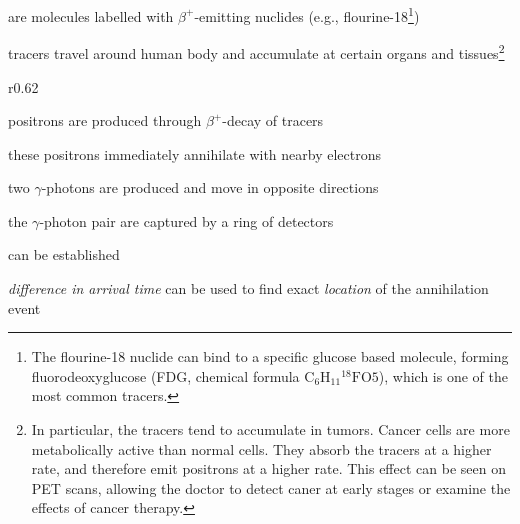  are molecules labelled with $\beta^+$-emitting nuclides (e.g., flourine-18\footnote{The flourine-18 nuclide can bind to a specific glucose based molecule, forming fluorodeoxyglucose (FDG, chemical formula $\text{C}_6\text{H}_{11}\text{}^{18}\text{F}\text{O}5$), which is one of the most common tracers.})

tracers travel around human body and accumulate at certain organs and tissues\footnote{In particular, the tracers tend to accumulate in tumors. Cancer cells are more metabolically active than normal cells. They absorb the tracers at a higher rate, and therefore emit positrons at a higher rate. This effect can be seen on PET scans, allowing the doctor to detect caner at early stages or examine the effects of cancer therapy.}

\begin{wrapfigure}{r}{0.62\textwidth}
    \vspace*{-12pt}
    \centering
    \vspace*{-25pt}
\end{wrapfigure}

positrons are produced through $\beta^+$-decay of tracers

these positrons immediately annihilate with nearby electrons

two $\gamma$-photons are produced and move in opposite directions

the $\gamma$-photon pair are captured by a ring of detectors

 can be established

\emph{difference in arrival time} can be used to find exact \emph{location} of the annihilation event

